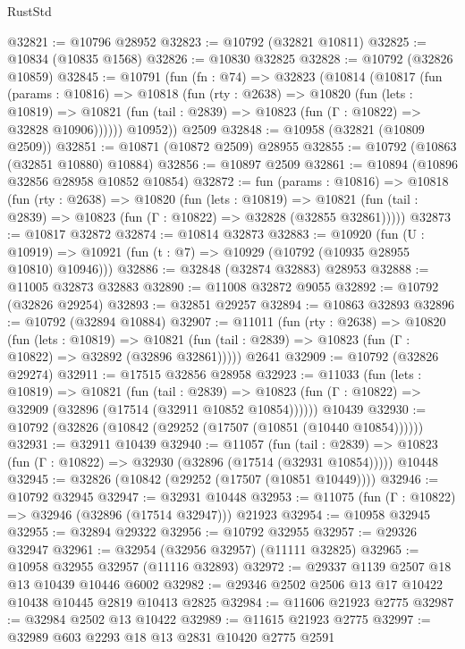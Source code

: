 \begin{lexlean}{RustStd}
\begin{coremodule}
@32821 := @10796 @28952
@32823 := @10792 (@32821 @10811)
@32825 := @10834 (@10835 @1568)
@32826 := @10830 @32825
@32828 := @10792 (@32826 @10859)
@32845 := @10791
    (fun (fn : @74) =>
    @32823
      (@10814
        (@10817
          (fun (params : @10816) =>
          @10818
            (fun (rty : @2638) =>
            @10820
              (fun (lets : @10819) =>
              @10821 (fun (tail : @2839) => @10823 (fun (Γ : @10822) => @32828 @10906))))))
        @10952))
    @2509
@32848 := @10958 (@32821 (@10809 @2509))
@32851 := @10871 (@10872 @2509) @28955
@32855 := @10792 (@10863 (@32851 @10880) @10884)
@32856 := @10897 @2509
@32861 := @10894 (@10896 @32856 @28958 @10852 @10854)
@32872 := fun (params : @10816) =>
  @10818
    (fun (rty : @2638) =>
    @10820
      (fun (lets : @10819) =>
      @10821 (fun (tail : @2839) => @10823 (fun (Γ : @10822) => @32828 (@32855 @32861)))))
@32873 := @10817 @32872
@32874 := @10814 @32873
@32883 := @10920
    (fun (U : @10919) => @10921 (fun (t : @7) => @10929 (@10792 (@10935 @28955 @10810) @10946)))
@32886 := @32848 (@32874 @32883) @28953
@32888 := @11005 @32873 @32883
@32890 := @11008 @32872 @9055
@32892 := @10792 (@32826 @29254)
@32893 := @32851 @29257
@32894 := @10863 @32893
@32896 := @10792 (@32894 @10884)
@32907 := @11011
    (fun (rty : @2638) =>
    @10820
      (fun (lets : @10819) =>
      @10821 (fun (tail : @2839) => @10823 (fun (Γ : @10822) => @32892 (@32896 @32861)))))
    @2641
@32909 := @10792 (@32826 @29274)
@32911 := @17515 @32856 @28958
@32923 := @11033
    (fun (lets : @10819) =>
    @10821
      (fun (tail : @2839) =>
      @10823 (fun (Γ : @10822) => @32909 (@32896 (@17514 (@32911 @10852 @10854))))))
    @10439
@32930 := @10792 (@32826 (@10842 (@29252 (@17507 (@10851 (@10440 @10854))))))
@32931 := @32911 @10439
@32940 := @11057
    (fun (tail : @2839) => @10823 (fun (Γ : @10822) => @32930 (@32896 (@17514 (@32931 @10854)))))
    @10448
@32945 := @32826 (@10842 (@29252 (@17507 (@10851 @10449))))
@32946 := @10792 @32945
@32947 := @32931 @10448
@32953 := @11075 (fun (Γ : @10822) => @32946 (@32896 (@17514 @32947))) @21923
@32954 := @10958 @32945
@32955 := @32894 @29322
@32956 := @10792 @32955
@32957 := @29326 @32947
@32961 := @32954 (@32956 @32957) (@11111 @32825)
@32965 := @10958 @32955 @32957 (@11116 @32893)
@32972 := @29337 @1139 @2507 @18 @13 @10439 @10446 @6002
@32982 := @29346 @2502 @2506 @13 @17 @10422 @10438 @10445 @2819 @10413 @2825
@32984 := @11606 @21923 @2775
@32987 := @32984 @2502 @13 @10422
@32989 := @11615 @21923 @2775
@32997 := @32989 @603 @2293 @18 @13 @2831 @10420 @2775 @2591

\end{coremodule}
\end{lexlean}
